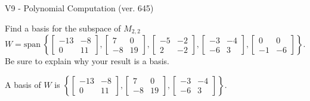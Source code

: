\begin{exercise}
  \begin{exerciseTitle}V9 - Polynomial Computation (ver. 645)\end{exerciseTitle}
  \begin{exerciseStatement}
    Find a basis for the subspace of \(M_{2,2}\) 
\[W=\mathrm{span}\ \left\{\left[\begin{array}{cc}
-13 & -8 \\
0 & 11
\end{array}\right] , \left[\begin{array}{cc}
7 & 0 \\
-8 & 19
\end{array}\right] , \left[\begin{array}{cc}
-5 & -2 \\
2 & -2
\end{array}\right] , \left[\begin{array}{cc}
-3 & -4 \\
-6 & 3
\end{array}\right] , \left[\begin{array}{cc}
0 & 0 \\
-1 & -6
\end{array}\right]\right\}.\]
 Be sure to explain why your result is a basis.


  \end{exerciseStatement}
  \begin{exerciseAnswer}
   A basis of \(W\) is  \(\left\{\left[\begin{array}{cc}
-13 & -8 \\
0 & 11
\end{array}\right] , \left[\begin{array}{cc}
7 & 0 \\
-8 & 19
\end{array}\right] , \left[\begin{array}{cc}
-3 & -4 \\
-6 & 3
\end{array}\right]\right\}\).
  


  \end{exerciseAnswer}
\end{exercise}